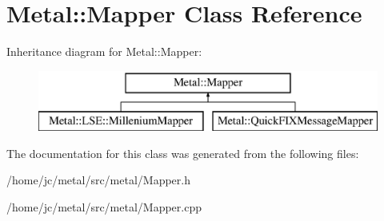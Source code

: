 \hypertarget{classMetal_1_1Mapper}{}\section{Metal\+:\+:Mapper Class Reference}
\label{classMetal_1_1Mapper}
Inheritance diagram for Metal\+:\+:Mapper\+:\begin{figure}[H]
\begin{center}
\leavevmode
\includegraphics[height=2.000000cm]{classMetal_1_1Mapper}
\end{center}
\end{figure}


The documentation for this class was generated from the following files\+:\begin{DoxyCompactItemize}
\item 
/home/jc/metal/src/metal/Mapper.\+h\item 
/home/jc/metal/src/metal/Mapper.\+cpp\end{DoxyCompactItemize}
